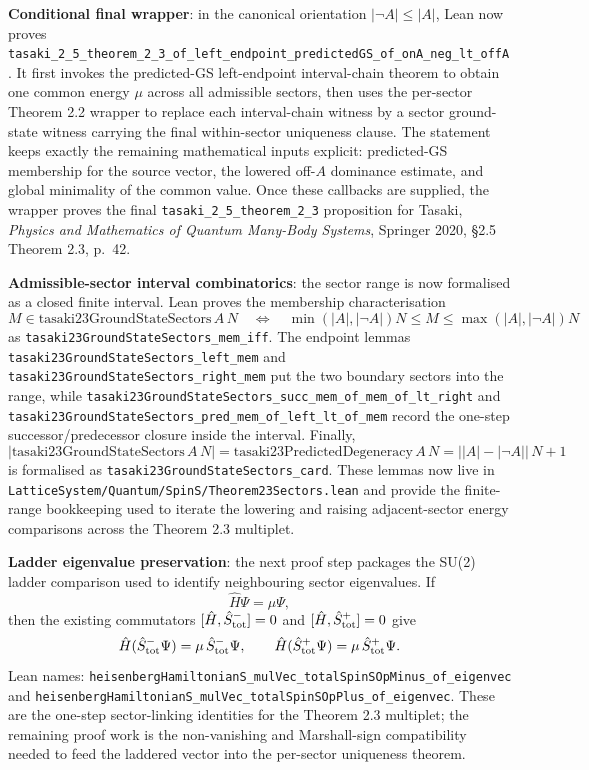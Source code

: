 \documentclass[a4paper,11pt]{article}
\begin{document}
\textbf{Conditional final wrapper}: in the canonical orientation
$|\neg A| \le |A|$, Lean now proves
\texttt{tasaki\_2\_5\_theorem\_2\_3\_of\_left\_endpoint\_predictedGS\_of\_onA\_neg\_lt\_offA}.
It first invokes the predicted-GS left-endpoint interval-chain theorem
to obtain one common energy $\mu$ across all admissible sectors, then
uses the per-sector Theorem 2.2 wrapper to replace each interval-chain
witness by a sector ground-state witness carrying the final
within-sector uniqueness clause.  The statement keeps exactly the
remaining mathematical inputs explicit: predicted-GS membership for
the source vector, the lowered off-$A$ dominance estimate, and global
minimality of the common value.  Once these callbacks are supplied, the
wrapper proves the final \texttt{tasaki\_2\_5\_theorem\_2\_3} proposition
for Tasaki, \emph{Physics and Mathematics of Quantum Many-Body Systems},
Springer 2020, \S2.5 Theorem 2.3, p.~42.

\textbf{Admissible-sector interval combinatorics}: the sector range is
now formalised as a closed finite interval.  Lean proves the membership
characterisation
\[
  M \in \mathrm{tasaki23GroundStateSectors}\,A\,N
  \quad\Longleftrightarrow\quad
  \min(|A|,|\neg A|)N \le M \le \max(|A|,|\neg A|)N
\]
as \texttt{tasaki23GroundStateSectors\_mem\_iff}.  The endpoint lemmas
\texttt{tasaki23GroundStateSectors\_left\_mem} and
\texttt{tasaki23GroundStateSectors\_right\_mem} put the two boundary
sectors into the range, while
\texttt{tasaki23GroundStateSectors\_succ\_mem\_of\_mem\_of\_lt\_right}
and
\texttt{tasaki23GroundStateSectors\_pred\_mem\_of\_left\_lt\_of\_mem}
record the one-step successor/predecessor closure inside the interval.
Finally,
\[
  |\mathrm{tasaki23GroundStateSectors}\,A\,N|
  =
  \mathrm{tasaki23PredictedDegeneracy}\,A\,N
  =
  \bigl||A|-|\neg A|\bigr|\,N+1
\]
is formalised as \texttt{tasaki23GroundStateSectors\_card}.  These
lemmas now live in
\texttt{LatticeSystem/Quantum/SpinS/Theorem23Sectors.lean} and provide
the finite-range bookkeeping used to iterate the lowering and raising
adjacent-sector energy comparisons across the Theorem 2.3 multiplet.

\textbf{Ladder eigenvalue preservation}: the next proof step packages
the SU(2) ladder comparison used to identify neighbouring sector
eigenvalues.  If
\[
  \hat H\Psi = \mu\Psi,
\]
then the existing commutators
$[\hat H,\hat S^-_{\rm tot}]=0$ and
$[\hat H,\hat S^+_{\rm tot}]=0$ give
\[
  \hat H(\hat S^-_{\rm tot}\Psi) = \mu\,\hat S^-_{\rm tot}\Psi,
  \qquad
  \hat H(\hat S^+_{\rm tot}\Psi) = \mu\,\hat S^+_{\rm tot}\Psi .
\]
Lean names:
\texttt{heisenbergHamiltonianS\_mulVec\_totalSpinSOpMinus\_of\_eigenvec}
and
\texttt{heisenbergHamiltonianS\_mulVec\_totalSpinSOpPlus\_of\_eigenvec}.
These are the one-step sector-linking identities for the Theorem 2.3
multiplet; the remaining proof work is the non-vanishing and
Marshall-sign compatibility needed to feed the laddered vector into
the per-sector uniqueness theorem.
\end{document}
